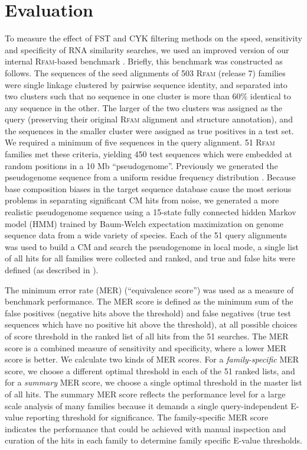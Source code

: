\section{Evaluation}

To measure the effect of FST and CYK filtering methods on the speed,
sensitivity and specificity of RNA similarity searches, we used an
improved version of our internal \textsc{Rfam}-based benchmark
\citep{Nawrocki09,NawrockiEddy07}.  Briefly, this benchmark was
constructed as follows. The sequences of the seed alignments of 503
\textsc{Rfam} (release 7) families were single linkage clustered by
pairwise sequence identity, and separated into two clusters such that
no sequence in one cluster is more than 60\% identical to any sequence
in the other. The larger of the two clusters was assigned as the query
(preserving their original \textsc{Rfam} alignment and structure
annotation), and the sequences in the smaller cluster were assigned as
true positives in a test set. We required a minimum of five sequences
in the query alignment. 51 \textsc{Rfam} families met these criteria,
yielding 450 test sequences which were embedded at random positions in
a 10 Mb ``pseudogenome''.  Previously we generated the pseudogenome
sequence from a uniform residue frequency distribution
\citep{NawrockiEddy07}.  Because base composition biases in the target
sequence database cause the most serious problems in separating
significant CM hits from noise, we generated a more realistic
pseudogenome sequence using a 15-state fully connected hidden Markov
model (HMM) trained by Baum-Welch expectation maximization
\citep{Durbin98} on genome sequence data from a wide variety of
species.  Each of the 51 query alignments was used to build a CM and
search the pseudogenome in local mode, a single list of all hits for
all families were collected and ranked, and true and false hits were
defined (as described in \citet{NawrockiEddy07}).

The minimum error rate (MER) (``equivalence score'') \cite{Pearson95}
was used as a measure of benchmark performance. The MER score is
defined as the minimum sum of the false positives (negative hits above
the threshold) and false negatives (true test sequences which have no
positive hit above the threshold), at all possible choices of score
threshold in the ranked list of all hits from the 51 searches. The MER
score is a combined measure of sensitivity and specificity, where a
lower MER score is better.  We calculate two kinds of MER scores. For
a \emph{family-specific} MER score, we choose a different optimal
threshold in each of the 51 ranked lists, and for a \emph{summary} MER
score, we choose a single optimal threshold in the master list of all
hits.  The summary MER score reflects the performance level for a
large scale analysis of many families because it demands a single
query-independent E-value reporting threshold for significance.  The
family-specific MER score indicates the performance that could be
achieved with manual inspection and curation of the hits in each
family to determine family specific E-value thresholds.

